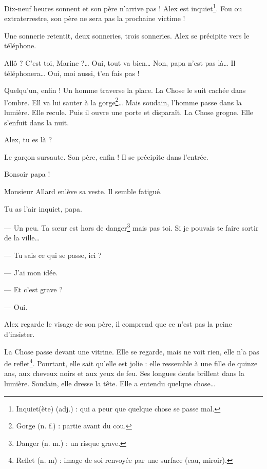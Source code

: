 Dix-neuf heures sonnent et son père n'arrive pas ! Alex est inquiet\footnote{Inquiet(ète) (adj.) : qui a peur que quelque chose se
passe mal.}. Fou ou extraterrestre, son père ne sera pas la prochaine victime !

Une sonnerie retentit, deux sonneries, trois sonneries. Alex se précipite vers le téléphone.

\og Allô ? C'est toi, Marine ?\ldots{} Oui, tout va bien\ldots{} Non, papa n'est pas là\ldots{} Il téléphonera\ldots{} Oui, moi
aussi, t'en fais pas ! \fg{}

Quelqu'un, enfin ! Un homme traverse la place. La Chose le suit cachée dans l'ombre. Ell va lui sauter à la gorge\footnote{Gorge
(n. f.) : partie avant du cou.}\ldots{} Mais soudain, l'homme passe dans la lumière. Elle recule. Puis il ouvre une porte et
disparaît. La Chose grogne. Elle s'enfuit dans la nuit.

\og Alex, tu es là ? \fg{}

Le gar\c{c}on sursaute. Son père, enfin ! Il se précipite dans l'entrée.

\og Bonsoir papa ! \fg{}

Monsieur Allard enlève sa veste. Il semble fatigué.

\og Tu as l'air inquiet, papa.

--- Un peu. Ta s\oe{}ur est hors de danger\footnote{Danger (n. m.) : un risque grave.} mais pas toi. Si je pouvais te faire sortir
    de la ville\ldots{}

--- Tu sais ce qui se passe, ici ?

--- J'ai mon idée.

--- Et c'est grave ?

--- Oui. \fg{}

Alex regarde le visage de son père, il comprend que ce n'est pas la peine d'insister.

La Chose passe devant une vitrine. Elle se regarde, mais ne voit rien, elle n'a pas de reflet\footnote{Reflet (n. m) : image de
soi renvoyée par une surface (eau, miroir).}. Pourtant, elle sait qu'elle est jolie : elle ressemble à une fille de quinze ans,
aux cheveux noirs et aux yeux de feu. Ses longues dents brillent dans la lumière. Soudain, elle dresse la tête. Elle a entendu
quelque chose\ldots{}
